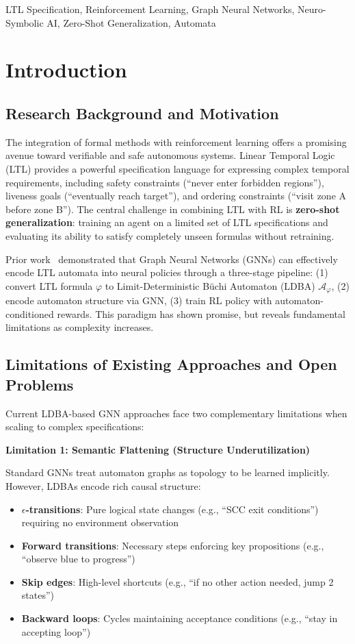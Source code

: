 \documentclass[conference]{IEEEtran}
\begin{document}
\begin{IEEEkeywords}
LTL Specification, Reinforcement Learning, Graph Neural Networks, Neuro-Symbolic AI, Zero-Shot Generalization, Automata
\end{IEEEkeywords}

\section{Introduction}

\subsection{Research Background and Motivation}

The integration of formal methods with reinforcement learning offers a promising avenue toward verifiable and safe autonomous systems. Linear Temporal Logic (LTL) provides a powerful specification language for expressing complex temporal requirements, including safety constraints (``never enter forbidden regions''), liveness goals (``eventually reach target''), and ordering constraints (``visit zone A before zone B''). The central challenge in combining LTL with RL is \textbf{zero-shot generalization}: training an agent on a limited set of LTL specifications and evaluating its ability to satisfy completely unseen formulas without retraining.

Prior work~\cite{jackermeier2025deepltl} demonstrated that Graph Neural Networks (GNNs) can effectively encode LTL automata into neural policies through a three-stage pipeline: (1) convert LTL formula $\varphi$ to Limit-Deterministic Büchi Automaton (LDBA) $\mathcal{A}_\varphi$, (2) encode automaton structure via GNN, (3) train RL policy with automaton-conditioned rewards. This paradigm has shown promise, but reveals fundamental limitations as complexity increases.

\subsection{Limitations of Existing Approaches and Open Problems}

Current LDBA-based GNN approaches face two complementary limitations when scaling to complex specifications:

\textbf{Limitation 1: Semantic Flattening (Structure Underutilization)}

Standard GNNs treat automaton graphs as topology to be learned implicitly. However, LDBAs encode rich causal structure:
\begin{itemize}
    \item \textbf{$\epsilon$-transitions}: Pure logical state changes (e.g., ``SCC exit conditions'') requiring no environment observation
    \item \textbf{Forward transitions}: Necessary steps enforcing key propositions (e.g., ``observe blue to progress'')
    \item \textbf{Skip edges}: High-level shortcuts (e.g., ``if no other action needed, jump 2 states'')
    \item \textbf{Backward loops}: Cycles maintaining acceptance conditions (e.g., ``stay in accepting loop'')
\end{itemize}
\end{document}
